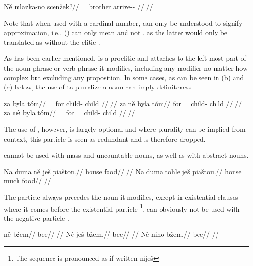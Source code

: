 \pex
\begingl
    \gla Ně mlazka-no scenžek?//
    \glb \Hon{}= brother arrive-\Av{}-\Pf{} //
    \glft {}//
\endgl
\xe

Note that when used with a cardinal number,  can only be understood to signify approximation, i.e., () can only mean  and not , as the latter would only be translated as  without the clitic .

As has been earlier mentioned,  is a proclitic and attaches to the left-most part of the noun phrase or verb phrase it modifies, including any modifier no matter how complex but excluding any proposition. In some cases, as can be seen in (b) and (c) below, the use of  to pluralize a noun can imply definiteness.

\pex
\a
\begingl{}
     za byla tóm//
    \glb \Pl{}= for child-\Acc{} child //
    \glft {}//
\endgl
\a
\begingl{}
    \gla za {ně} byla tóm//
    \glb for \Pl{}= child-\Acc{} child //
    \glft {}//
\endgl
\a
\begingl{}
     za \textbf{ně} byla tóm//
    \glb \Pl{}= for \Pl{}= child-\Acc{} child //
    \glft {}//
\endgl
\xe

The use of , however, is largely optional and where plurality can be implied from context, this particle is seen as redundant and is therefore dropped.

 cannot be used with mass and uncountable nouns, as well as with abstract nouns.

\pex
\a
\begingl
\gla *Na duma ně ješ piaštou.//
\glb \Loc{} house \Pl{} \Exst{} food//
\glft {}//
\endgl
\a
\begingl
\gla Na duma tohle ješ piaštou.//
\glb \Loc{} house much \Exst{} food//
\glft {}//
\endgl
\xe

The particle  always precedes the noun it modifies, except in existential clauses where it comes before the existential particle \footnote{The sequence is pronounced as if written níješ }.  can obviously not be used with the negative particle .

\pex
\a
\begingl
\gla ně bžem//
\glb \Pl{} bee//
\glft {}//
\endgl
\a
\begingl
\gla Ně ješ bžem.//
\glb \Pl{} \Exst{} bee//
\glft {}//
\endgl
\a
\begingl
\gla *Ně niho bžem.//
\glb \Pl{} \N{}\Exst{} bee//
\glft {}//
\endgl
\xe

